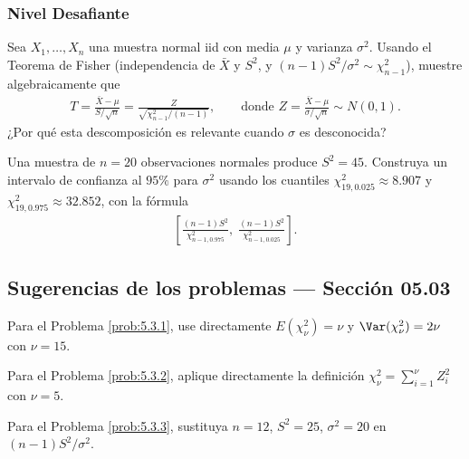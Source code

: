 \subsubsection*{Nivel Desafiante}

\begin{problema}
	\label{prob:5.3.9}
	Sea $X_1,\ldots,X_n$ una muestra normal iid con media $\mu$ y varianza $\sigma^2$. Usando el Teorema de Fisher (independencia de $\bar X$ y $S^2$, y $(n-1)S^2/\sigma^2\sim\chi^2_{n-1}$), muestre algebraicamente que
	\begin{align*}
		T = \frac{\bar X-\mu}{S/\sqrt n} = \frac{Z}{\sqrt{\chi^2_{n-1}/(n-1)}}, \qquad \text{donde } Z=\frac{\bar X-\mu}{\sigma/\sqrt n} \sim N(0,1).
	\end{align*}
	¿Por qué esta descomposición es relevante cuando $\sigma$ es desconocida?
\end{problema}

\begin{problema}
	\label{prob:5.3.10}
	Una muestra de $n=20$ observaciones normales produce $S^2=45$. Construya un intervalo de confianza al $95\%$ para $\sigma^2$ usando los cuantiles $\chi^2_{19,0.025}\approx 8.907$ y $\chi^2_{19,0.975}\approx 32.852$, con la fórmula
	\begin{align*}
		\left[\frac{(n-1)S^2}{\chi^2_{n-1,0.975}},\; \frac{(n-1)S^2}{\chi^2_{n-1,0.025}}\right].
	\end{align*}
\end{problema}

\subsection*{Sugerencias de los problemas --- Sección 05.03}

\begin{sugerencia}
	\label{sug:5.3.1}
	Para el Problema \ref{prob:5.3.1}, use directamente $E(\chi^2_\nu)=\nu$ y $\Var(\chi^2_\nu)=2\nu$ con $\nu=15$.
\end{sugerencia}

\begin{sugerencia}
	\label{sug:5.3.2}
	Para el Problema \ref{prob:5.3.2}, aplique directamente la definición $\chi^2_\nu=\sum_{i=1}^\nu Z_i^2$ con $\nu=5$.
\end{sugerencia}

\begin{sugerencia}
	\label{sug:5.3.3}
	Para el Problema \ref{prob:5.3.3}, sustituya $n=12$, $S^2=25$, $\sigma^2=20$ en $(n-1)S^2/\sigma^2$.
\end{sugerencia}

